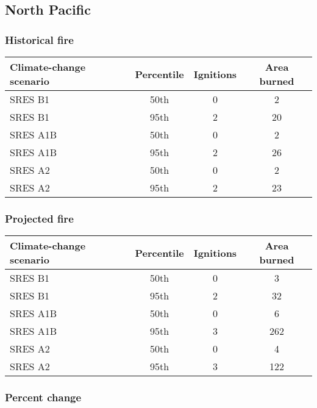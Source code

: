 \documentclass{article}\usepackage[]{graphicx}\usepackage[]{color}
\newcommand{\headcol}{\rowcolor{tableheadcolor}}
\begin{document}
\newpage
\subsection{North Pacific}
\subsubsection{Historical fire}

\begin{table}[ht]
\centering
\begin{tabular}{lccc}
  \headcol 
 \toprule
Climate-change scenario & Percentile & Ignitions & Area burned \\ 
  \midrule
SRES B1 & 50th & 0 & 2 \\ 
  SRES B1 & 95th & 2 & 20 \\ 
  SRES A1B & 50th & 0 & 2 \\ 
  SRES A1B & 95th & 2 & 26 \\ 
  SRES A2 & 50th & 0 & 2 \\ 
  SRES A2 & 95th & 2 & 23 \\ 
   \bottomrule
\end{tabular}
\end{table}


\subsubsection{Projected fire}

\begin{table}[ht]
\centering
\begin{tabular}{lccc}
  \headcol 
 \toprule
Climate-change scenario & Percentile & Ignitions & Area burned \\ 
  \midrule
SRES B1 & 50th & 0 & 3 \\ 
  SRES B1 & 95th & 2 & 32 \\ 
  SRES A1B & 50th & 0 & 6 \\ 
  SRES A1B & 95th & 3 & 262 \\ 
  SRES A2 & 50th & 0 & 4 \\ 
  SRES A2 & 95th & 3 & 122 \\ 
   \bottomrule
\end{tabular}
\end{table}


\subsubsection{Percent change}
\end{document}

